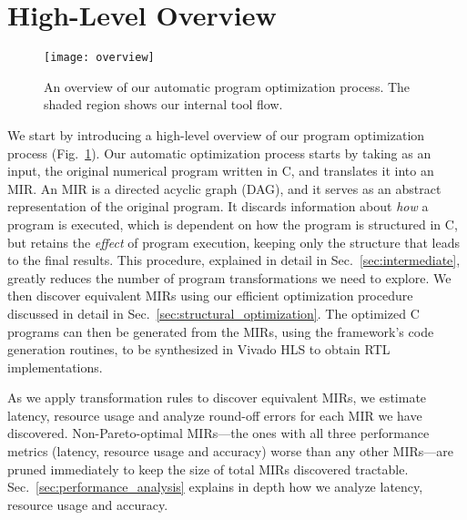 \section{High-Level Overview}
\label{sec:overview}

\begin{figure}[ht]
    \centering
    \texttt{[image: overview]}
    \caption{%
        An overview of our automatic program optimization process. The shaded
        region shows our internal tool flow.
    }\label{fig:overview}
\end{figure}

We start by introducing a high-level overview of our program optimization
process (Fig.~\ref{fig:overview}).  Our automatic optimization process starts
by taking as an input, the original numerical program written in C, and
translates it into an MIR\@.  An MIR is a directed acyclic graph (DAG), and
it serves as an abstract representation of the original program.  It discards
information about \emph{how} a program is executed, which is dependent on
how the program is structured in C, but retains the \emph{effect} of program
execution, keeping only the structure that leads to the final results.  This
procedure, explained in detail in Sec.~\ref{sec:intermediate}, greatly reduces
the number of program transformations we need to explore.  We then discover
equivalent MIRs using our efficient optimization procedure discussed in detail
in Sec.~\ref{sec:structural_optimization}.  The optimized C programs can then
be generated from the MIRs, using the \SOAP{} framework's code generation
routines, to be synthesized in Vivado HLS to obtain RTL implementations.

As we apply transformation rules to discover equivalent MIRs, we estimate
latency, resource usage and analyze round-off errors for each MIR we have
discovered.  Non-Pareto-optimal MIRs---the ones with all three performance
metrics (latency, resource usage and accuracy) worse than any other MIRs---are
pruned immediately to keep the size of total MIRs discovered tractable.
Sec.~\ref{sec:performance_analysis} explains in depth how we analyze latency,
resource usage and accuracy.
